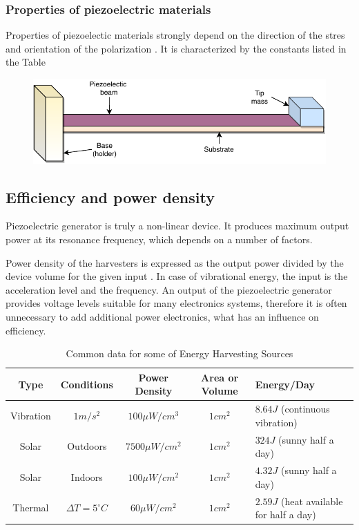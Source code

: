 \documentclass[12pt,a4paper]{article}
\begin{document}
\subsubsection{Properties of piezoelectric materials}
Properties of piezoelectic materials strongly depend on the direction of the stres and orientation of the polarization \cite{EnHv1}. It is characterized by the constants listed in the Table 



\begin{figure}[ht!]
\includegraphics[scale=1]{beam1.pdf}
\end{figure}

\subsection{Efficiency and power density}
Piezoelectric generator is truly a non-linear device. It produces maximum output power at its resonance frequency, which depends on a number of factors. 
\par
Power density of the harvesters is expressed as the output power divided by the device volume for the given input \cite{EnHv2}. In case of vibrational energy, the input is the acceleration level and the frequency. An output of the piezoelectric generator provides voltage levels suitable for many electronics systems, therefore it is often unnecessary to add additional power electronics, what has an influence on efficiency.
\par
\begin{table}[ht!]
\small
\begin{center} 
\begin{tabular}{|c|c|c|c|l|}
\hline 
\textbf{Type} & \textbf{Conditions} & \textbf{Power Density} & \textbf{Area or Volume} & \textbf{Energy/Day} \\ 
\hline 
\hline
Vibration & $1m/s^2$ & $100\mu W/cm^3$ & $1cm^2$ & $8.64J$ (continuous vibration) \\ 
\hline 
Solar & Outdoors & $7500\mu W/cm^2$ & $1cm^2$ & $324J$ (sunny half a day) \\ 
\hline 
Solar & Indoors & $100\mu W/cm^2$ & $1cm^2$ & $4.32J$ (sunny half a day) \\ 
\hline 
Thermal & $\Delta T = 5 ^{\circ} C$ & $60\mu W/cm^2$ & $1cm^2$ & $2.59J$ (heat available for half a day) \\ 
\hline 
\end{tabular} 
\end{center}
\caption{Common data for some of Energy Harvesting Sources \cite{EnHv1}}
\label{tab:typdat}
\end{table}
\par
\end{document}
